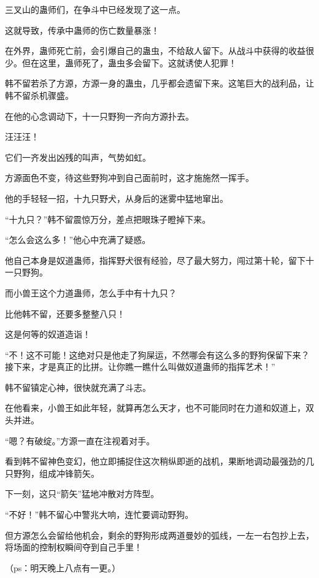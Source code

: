 \begin{this_body}
三叉山的蛊师们，在争斗中已经发现了这一点。

这就导致，传承中蛊师的伤亡数量暴涨！

在外界，蛊师死亡前，会引爆自己的蛊虫，不给敌人留下。从战斗中获得的收益很少。但在这里，蛊师死了，蛊虫多会留下。这就诱使人犯罪！

韩不留若杀了方源，方源一身的蛊虫，几乎都会遗留下来。这笔巨大的战利品，让韩不留杀机骤盛。

在他的心念调动下，十一只野狗一齐向方源扑去。

汪汪汪！

它们一齐发出凶残的叫声，气势如虹。

方源面色不变，待这些野狗冲到自己面前时，这才施施然一挥手。

他的手轻轻一招，十九只野犬，从身后的迷雾中猛地窜出。

“十九只？”韩不留震惊万分，差点把眼珠子瞪掉下来。

“怎么会这么多！”他心中充满了疑惑。

他自己本身是奴道蛊师，指挥野犬很有经验，尽了最大努力，闯过第十轮，留下十一只野狗。

而小兽王这个力道蛊师，怎么手中有十九只？

比他韩不留，还要多整整八只！

这是何等的奴道造诣！

“不！这不可能！这绝对只是他走了狗屎运，不然哪会有这么多的野狗保留下来？接下来，才是真正的比拼。让你瞧一瞧什么叫做奴道蛊师的指挥艺术！”

韩不留镇定心神，很快就充满了斗志。

在他看来，小兽王如此年轻，就算再怎么天才，也不可能同时在力道和奴道上，双头并进。

“嗯？有破绽。”方源一直在注视着对手。

看到韩不留神色变幻，他立即捕捉住这次稍纵即逝的战机，果断地调动最强劲的几只野狗，组成冲锋箭矢。

下一刻，这只“箭矢”猛地冲散对方阵型。

“不好！”韩不留心中警兆大响，连忙要调动野狗。

但方源怎么会留给他机会，剩余的野狗形成两道曼妙的弧线，一左一右包抄上去，将场面的控制权瞬间夺到自己手里！

（ps：明天晚上八点有一更。）

\end{this_body}

